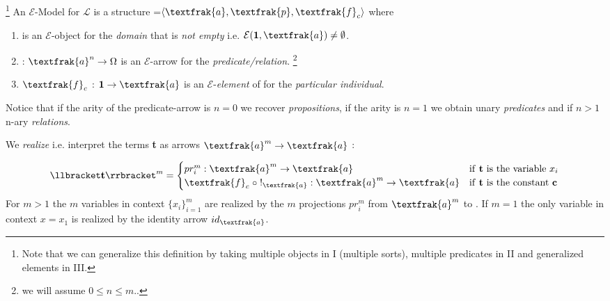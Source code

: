 \begin{definition} \footnote{	Note that we can generalize this definition by taking multiple objects in I (multiple sorts), multiple predicates in II and generalized elements in III.}
	An $\mathcal{E}$-Model for $\mathcal{L}$ is a structure =$\langle \textfrak{a}, \textfrak{p}, \textfrak{f}_c \rangle$ where
	\begin{enumerate}[label=\Roman*]
			\item 	\;\; is an $\mathcal{E}$-object for the \emph{domain} that is \emph{not empty} i.e. $\mathcal{E}(\textbf{1},\textfrak{a})\neq \emptyset$.
			\item 	 \;\; 	:	$\textfrak{a}^n \rightarrow \Omega$ is an $\mathcal{E}$-arrow for the \emph{predicate/relation}. \footnote{we will assume $0 \leq n \leq m$..}
			\item 	\;\;$\textfrak{f}_c$	:	$\textbf{1} \rightarrow \textfrak{a}$ is an $\mathcal{E}$-\emph{element} of  for the \emph{particular individual}.
		\end{enumerate}
\end{definition}

\begin{remark}
	Notice that if the arity of the predicate-arrow is $n=0$ we recover \emph{propositions}, if the arity is $n=1$ we obtain unary \emph{predicates} and if $n>1$ n-ary \emph{relations}. 
\end{remark}
We \emph{realize} i.e. interpret the terms \textbf{t} as arrows $\textfrak{a}^m \rightarrow \textfrak{a}$ :

\begin{definition}
	\begin{equation*}
			\llbracket \textbf{t} \rrbracket^m =
			\begin{cases}
					pr_i^m : \textfrak{a}^m \rightarrow \textfrak{a} & \text{if \textbf{t} is the variable $x_i$}\\
					\textfrak{f}_c \;\circ\; !_\textfrak{a} : \textfrak{a}^m \rightarrow \textfrak{a}  & \text{if \textbf{t} is the constant \textbf{c}}
				\end{cases}   
		\end{equation*}  
	For $m>1$ the $m$ variables in context $\{x_i\}_{i=1}^m$ are realized by the $m$ projections $pr_i^m$ from $\textfrak{a}^m$ to . \newline
	If $m=1$ the only variable in context $x = x_1$ is realized by the identity arrow $id_\textfrak{a}$.
\end{definition}


